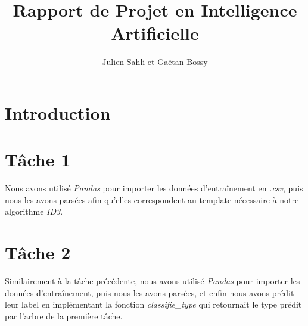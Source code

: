 \documentclass[a4paper,11pt,french]{article}
\title{Rapport de Projet en Intelligence Artificielle}
\author{Julien Sahli et Gaëtan Bossy}
\begin{document}
\maketitle
\section{Introduction}
\section{Tâche 1}
Nous avons utilisé \emph{Pandas} pour importer les données d'entraînement en \emph{.csv}, puis nous les avons parsées afin qu'elles correspondent au template nécessaire à notre algorithme \emph{ID3}. %
\section{Tâche 2}
Similairement à la tâche précédente, nous avons utilisé \emph{Pandas} pour importer les données d'entraînement, puis nous les avons parsées, et enfin nous avons prédit leur label en implémentant la fonction \emph{classifie\_type} qui retournait le type prédit par l'arbre de la première tâche. 
\end{document}
